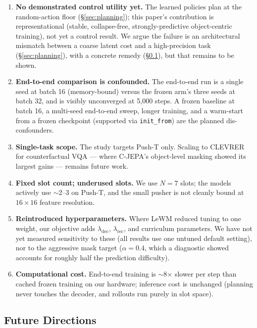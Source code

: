 \documentclass[12pt]{article}
\begin{document}
\begin{enumerate}[leftmargin=*]
    \item \textbf{No demonstrated control utility yet.} The learned policies plan at the random-action floor (\S\ref{sec:planning}); this paper's contribution is representational (stable, collapse-free, strongly-predictive object-centric training), not yet a control result. We argue the failure is an architectural mismatch between a coarse latent cost and a high-precision task (\S\ref{sec:planning}), with a concrete remedy (\S\ref{sec:future}), but that remains to be shown.
    \item \textbf{End-to-end comparison is confounded.} The end-to-end run is a single seed at batch 16 (memory-bound) versus the frozen arm's three seeds at batch 32, and is visibly unconverged at 5{,}000 steps. A frozen baseline at batch 16, a multi-seed end-to-end sweep, longer training, and a warm-start from a frozen checkpoint (supported via \texttt{init\_from}) are the planned dis-confounders.
    \item \textbf{Single-task scope.} The study targets Push-T only. Scaling to CLEVRER for counterfactual VQA --- where C-JEPA's object-level masking showed its largest gains --- remains future work.
    \item \textbf{Fixed slot count; underused slots.} We use $N{=}7$ slots; the models actively use $\sim$2--3 on Push-T, and the small pusher is not cleanly bound at $16 \times 16$ feature resolution.
    \item \textbf{Reintroduced hyperparameters.} Where LeWM reduced tuning to one weight, our objective adds $\lambda_{\text{dec}}$, $\lambda_{\text{rec}}$, and curriculum parameters. We have not yet measured sensitivity to these (all results use one untuned default setting), nor to the aggressive mask target ($\alpha = 0.4$, which a diagnostic showed accounts for roughly half the prediction difficulty).
    \item \textbf{Computational cost.} End-to-end training is $\sim$8$\times$ slower per step than cached frozen training on our hardware; inference cost is unchanged (planning never touches the decoder, and rollouts run purely in slot space).
\end{enumerate}

\subsection{Future Directions}
\label{sec:future}
\end{document}
